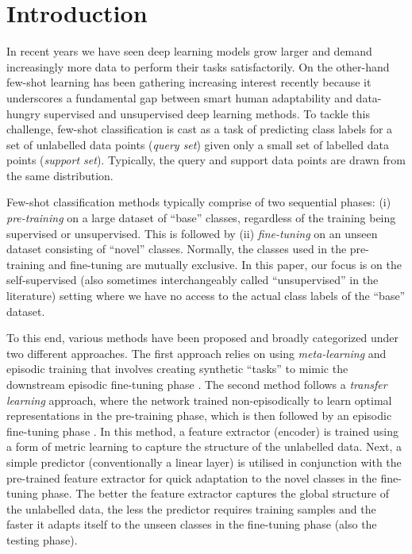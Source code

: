 \chapter{Introduction}\label{sec:intro}

In recent years we have seen deep learning models grow larger and demand increasingly more data to perform their tasks satisfactorily. 
On the other-hand few-shot learning has been gathering increasing interest recently because it underscores a fundamental gap between smart human adaptability and data-hungry supervised and unsupervised deep learning methods. To tackle this challenge, few-shot classification is cast as a task of predicting class labels for a set of unlabelled data points (\textit{query set}) given only a small set of labelled data points (\textit{support set}). Typically, the query and support data points are drawn from the same distribution. 

Few-shot classification methods typically comprise of two sequential phases: (i) \textit{pre-training} on a large dataset of ``base'' classes, regardless of the training being supervised or unsupervised. This is followed by (ii) \textit{fine-tuning} on an unseen dataset consisting of ``novel'' classes. Normally, the classes used in the pre-training and fine-tuning are mutually exclusive. In this paper, our focus is on the self-supervised (also sometimes interchangeably called ``unsupervised'' in the literature) setting where we have no access to the actual class labels of the ``base'' dataset.

To this end, various methods have been proposed and broadly categorized under two different approaches. The first approach relies on using \textit{meta-learning} and episodic training that involves creating synthetic ``tasks'' to mimic the downstream episodic fine-tuning phase \parencite{Finn2017Model-agnosticNetworks, Hsu2018UnsupervisedMeta-Learning, Khodadadeh2018UnsupervisedClassification, Antoniou2019AssumeAugmentation, Ye2022, lee2021meta, Ji2019UnsupervisedTraining}. 
The second method follows a \textit{transfer learning} approach, where the network trained non-episodically to learn optimal representations in the pre-training phase, which is then followed by an episodic fine-tuning phase \parencite{Medina2020Self-SupervisedClassification, goodemballneed2020, dhillon2019baseline}.
In this method, a feature extractor (encoder) is trained using a form of metric learning to capture the structure of the unlabelled data. 
Next, a simple predictor (conventionally a linear layer) is utilised in conjunction with the pre-trained feature extractor for quick adaptation to the novel classes in the fine-tuning phase.
The better the feature extractor captures the global structure of the unlabelled data, the less the predictor requires training samples and the faster it adapts itself to the unseen classes in the fine-tuning phase (also the testing phase).

